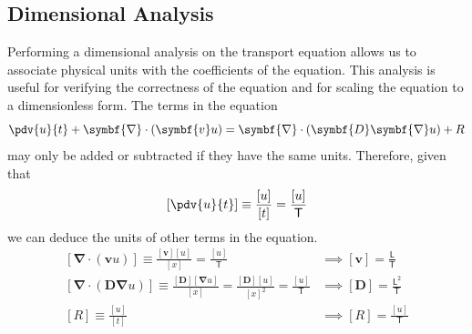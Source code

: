 \documentclass{article}
\begin{document}
\subsection{Dimensional Analysis}
Performing a dimensional analysis on the transport equation allows us
to associate physical units with the coefficients of the equation. This
analysis is useful for verifying the correctness of the equation and
for scaling the equation to a dimensionless form. The terms in the
equation
\begin{equation*}
    \pdv{u}{t} + \symbf{\nabla} \cdot \left( \symbf{v} u \right) = \symbf{\nabla} \cdot \left( \symbf{D} \symbf{\nabla} u \right) + R
\end{equation*}
may only be added or subtracted if they have the same units. Therefore,
given that
\begin{equation*}
    \left[ \pdv{u}{t} \right] \equiv \frac{\left[ u \right]}{\left[ t \right]} = \frac{\left[ u \right]}{\mathsf{T}}
\end{equation*}
we can deduce the units of other terms in the equation.
\begin{align*}
    \left[ \symbf{\nabla} \cdot \left( \symbf{v} u \right) \right] \equiv \frac{\left[ \symbf{v} \right] \left[ u \right]}{\left[ x \right]} = \frac{\left[ u \right]}{\mathsf{T}}                                                                                                        & \implies \left[ \symbf{v} \right] = \frac{\mathsf{L}}{\mathsf{T}}   \\
    \left[ \symbf{\nabla} \cdot \left( \symbf{D} \symbf{\nabla} u \right) \right] \equiv \frac{\left[ \symbf{D} \right] \left[ \symbf{\nabla} u \right]}{\left[ x \right]} = \frac{\left[ \symbf{D} \right] \left[ u \right]}{{\left[ x \right]}^2} = \frac{\left[ u \right]}{\mathsf{T}} & \implies \left[ \symbf{D} \right] = \frac{\mathsf{L}^2}{\mathsf{T}} \\
    \left[ R \right] \equiv \frac{\left[ u \right]}{\left[ t \right]}                                                                                                                                                                                                                     & \implies \left[ R \right] = \frac{\left[ u \right]}{\mathsf{T}}
\end{align*}
\end{document}
